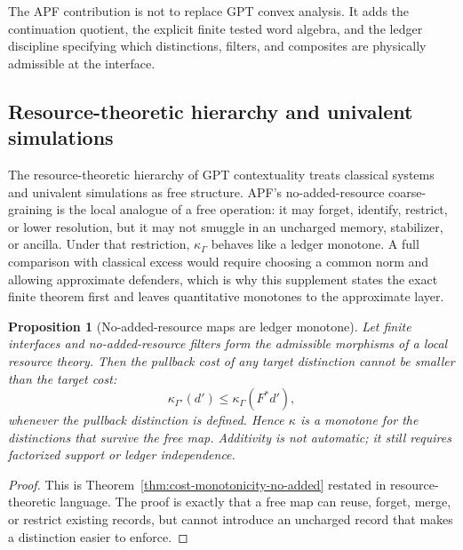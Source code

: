 \documentclass[11pt]{article}
\newtheorem{proposition}[theorem]{Proposition}
\begin{document}
The APF contribution is not to replace GPT convex analysis.  It adds
the continuation quotient, the explicit finite tested word algebra,
and the ledger discipline specifying which distinctions, filters, and
composites are physically admissible at the interface.

\subsection*{Resource-theoretic hierarchy and univalent simulations}
The resource-theoretic hierarchy of GPT contextuality treats classical systems and univalent simulations as free structure.  APF's no-added-resource coarse-graining is the local analogue of a free operation: it may forget, identify, restrict, or lower resolution, but it may not smuggle in an uncharged memory, stabilizer, or ancilla.  Under that restriction, $\kappa_\Gamma$ behaves like a ledger monotone.  A full comparison with classical excess would require choosing a common norm and allowing approximate defenders, which is why this supplement states the exact finite theorem first and leaves quantitative monotones to the approximate layer.

\begin{proposition}[No-added-resource maps are ledger monotone]
Let finite interfaces and no-added-resource filters form the admissible morphisms of a local resource theory.  Then the pullback cost of any target distinction cannot be smaller than the target cost:
\[
  \kappa_{\Gamma'}(d')\le \kappa_\Gamma(F^*d'),
\]
whenever the pullback distinction is defined.  Hence \(\kappa\) is a monotone for the distinctions that survive the free map.  Additivity is not automatic; it still requires factorized support or ledger independence.
\end{proposition}
\begin{proof}
This is Theorem~\ref{thm:cost-monotonicity-no-added} restated in resource-theoretic language.  The proof is exactly that a free map can reuse, forget, merge, or restrict existing records, but cannot introduce an uncharged record that makes a distinction easier to enforce.
\end{proof}
\end{document}
